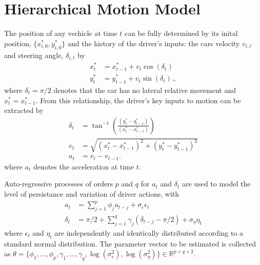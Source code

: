 \documentclass[12pt,a4paper]{article}\usepackage[]{graphicx}\usepackage[]{color}
\begin{document}
\section{Hierarchical Motion Model}

The position of any vechicle at time $t$ can be fully determined by its inital position, $\{x^*_{i, 0}, y^*_{i, 0}\}$ and the history of the driver's inputs: the cars velocity $v_{i, t}$ and steering angle, $\delta_{i, t}$ by
\begin{align}
x^*_{t} &= x^*_{t-1} + v_{t} \cos(\delta_{t}) \label{xEq} \\
y^*_{t} &= y^*_{t-1} + v_{t} \sin(\delta_{t}). \label{yEq},
\end{align}
where $\delta_{t} = \pi/2$ denotes that the car has no lateral relative movement and $x^*_{t} = x^*_{t-1}$.
From this relationship, the driver's key inputs to motion can be extracted by
\begin{align}
\delta_{t} &= \tan^{-1}\left(\frac{(y^*_{t} - y^*_{t-1})}{(x^*_{t} - x^*_{t-1})} \right) \label{dEq} \\
v_{t} &= \sqrt{(x^*_{t} - x^*_{t-1})^2 + (y^*_{t} - y^*_{t-1})^2} \label{vEq} \\
a_{t} &= v_{t} - v_{t-1}. \label{aEq}
\end{align}
where $a_{t}$ denotes the acceleration at time $t$.

Auto-regressive processes of orders $p$ and $q$ for $a_t$ and  $\delta_t$ are used to model the level of persistance and variation of driver actions, with
\begin{align}
a_{t} &= \sum_{j = 1}^p \phi_{j} a_{t-j} + \sigma_{\epsilon} \epsilon_{t} \label{aAR} \\
\delta_{t} &= \pi/2 + \sum_{j = 1}^q \gamma_{j} (\delta_{t-j} - \pi/2) + \sigma_{\eta} \eta_{t} \label{dAR}
\end{align}
where $\epsilon_{t}$ and $\eta_t$ are independently and identically distributed according to a standard normal distribution. The parameter vector to be estimated is collected as $\theta = \{\phi_{1}, \dots, \phi_{p}, \gamma_{1}, \dots, \gamma_{q}, \log(\sigma^{2}_{\epsilon}), \log(\sigma^{2}_{\eta})\} \in \mathbb{R}^{p + q + 2}$.
\end{document}
